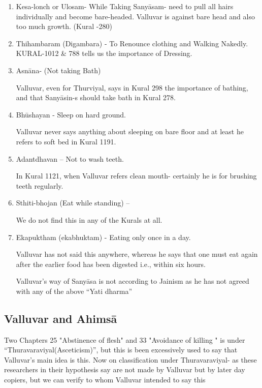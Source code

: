 \begin{enumerate}[{\rm 1)}]
\itemsep=0pt
\item Kesa-lonch or Ulosam- While Taking Sanyāsam- need to pull all hairs individually and become bare-headed. Valluvar is against bare head and also too much growth. (Kural -280)
 
 \item Thihambaram (Digambara) - To Renounce clothing and Walking Nakedly. KURAL-1012 \& 788 tells us the importance of Dressing.
 
 \item 
 Asnāna- (Not taking Bath)

 Valluvar, even for Thurviyal, says in Kural 298 the importance of bathing, and that Sanyāsin-s should take bath in Kural 278.

 \item 
 Bhūshayan - Sleep on hard ground.

 Valluvar never says anything about sleeping on bare floor and at least he refers to soft bed in Kural 1191.

 \item 
 Adantdhavan – Not to wash teeth.

 In Kural 1121, when Valluvar refers clean mouth- certainly he is for brushing teeth regularly.

 \item 
 Sthiti-bhojan (Eat while standing) –

 We do not find this in any of the Kurals at all.

 \item 
 Ekapuktham (ekabhuktam) - Eating only once in a day.

 Valluvar has not said this anywhere, whereas he says that one must eat again after the earlier food has been digested i.e., within six hours.

 Valluvar’s way of Sanyāsa is not according to Jainism as he has not agreed with any of the above “Yati dharma”

\end{enumerate}


\subsection*{Valluvar and Ahimsā}

Two Chapters 25 "Abstinence of flesh" and 33 "Avoidance of killing " is under “Thuravaraviyal(Asceticism)”, but this is been excessively used to say that Valluvar’s main idea is this. Now on classification under Thuravaraviyal- as these researchers in their hypothesis say are not made by Valluvar but by later day copiers, but we can verify to whom Valluvar intended to say this

